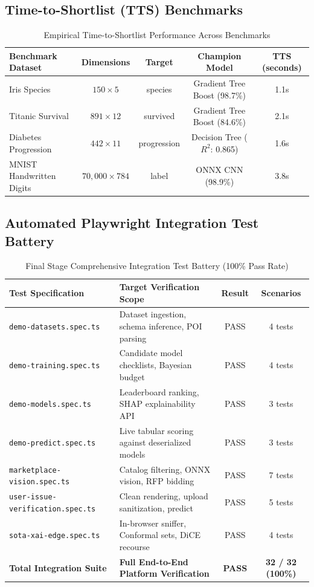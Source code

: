 \documentclass[11pt,a4paper]{article}
\begin{document}
\subsection{Time-to-Shortlist (TTS) Benchmarks}
\begin{table}[H]
\centering
\begin{tabular}{lcccc}
\toprule
\textbf{Benchmark Dataset} & \textbf{Dimensions} & \textbf{Target} & \textbf{Champion Model} & \textbf{TTS (seconds)} \\
\midrule
Iris Species & $150 \times 5$ & species & Gradient Tree Boost (98.7\%) & 1.1s \\
Titanic Survival & $891 \times 12$ & survived & Gradient Tree Boost (84.6\%) & 2.1s \\
Diabetes Progression & $442 \times 11$ & progression & Decision Tree ($R^2$: 0.865) & 1.6s \\
MNIST Handwritten Digits & $70,000 \times 784$ & label & ONNX CNN (98.9\%) & 3.8s \\
\bottomrule
\end{tabular}
\caption{Empirical Time-to-Shortlist Performance Across Benchmarks}
\label{tab:final_tts}
\end{table}

\subsection{Automated Playwright Integration Test Battery}
\begin{table}[H]
\centering
\begin{tabular}{llcc}
\toprule
\textbf{Test Specification} & \textbf{Target Verification Scope} & \textbf{Result} & \textbf{Scenarios} \\
\midrule
\texttt{demo-datasets.spec.ts} & Dataset ingestion, schema inference, POI parsing & PASS & 4 tests \\
\texttt{demo-training.spec.ts} & Candidate model checklists, Bayesian budget & PASS & 4 tests \\
\texttt{demo-models.spec.ts} & Leaderboard ranking, SHAP explainability API & PASS & 3 tests \\
\texttt{demo-predict.spec.ts} & Live tabular scoring against deserialized models & PASS & 3 tests \\
\texttt{marketplace-vision.spec.ts} & Catalog filtering, ONNX vision, RFP bidding & PASS & 7 tests \\
\texttt{user-issue-verification.spec.ts} & Clean rendering, upload sanitization, predict & PASS & 5 tests \\
\texttt{sota-xai-edge.spec.ts} & In-browser sniffer, Conformal sets, DiCE recourse & PASS & 4 tests \\
\midrule
\textbf{Total Integration Suite} & \textbf{Full End-to-End Platform Verification} & \textbf{PASS} & \textbf{32 / 32 (100\%)} \\
\bottomrule
\end{tabular}
\caption{Final Stage Comprehensive Integration Test Battery (100\% Pass Rate)}
\label{tab:test_suite}
\end{table}
\end{document}

